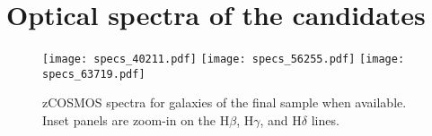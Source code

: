 \documentclass[traditabstract]{aa} %
\begin{document}


\appendix

\section{\label{optspec}Optical spectra of the candidates}
\begin{figure*}[!h] 
   	\texttt{[image: specs\_40211.pdf]}
   	\texttt{[image: specs\_56255.pdf]}
   	\texttt{[image: specs\_63719.pdf]}
  	\caption{\label{spec1} zCOSMOS spectra for galaxies of the final sample when available. Inset panels are zoom-in on the H$\beta$, H$\gamma$, and H$\delta$ lines.}
\end{figure*}


\end{document}
